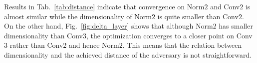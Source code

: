 \documentclass{article} %
\begin{document}
Results in Tab.~\ref{tab:distance} indicate that convergence on Norm$2$ and 
Conv$2$ is almost similar while the dimensionality of Norm$2$ is quite smaller 
than Conv$2$. On the other hand, Fig.~\ref{fig:delta_layer} shows that although 
Norm$2$ has smaller dimensionality than Conv$3$,  the optimization converges to 
a closer point on Conv$3$ rather than Conv$2$ and hence Norm$2$.  This means 
that the relation between dimensionality and the achieved distance of the 
adversary is not straightforward.
 

\begin{table*}[h!]
\end{table*}
\end{document}
